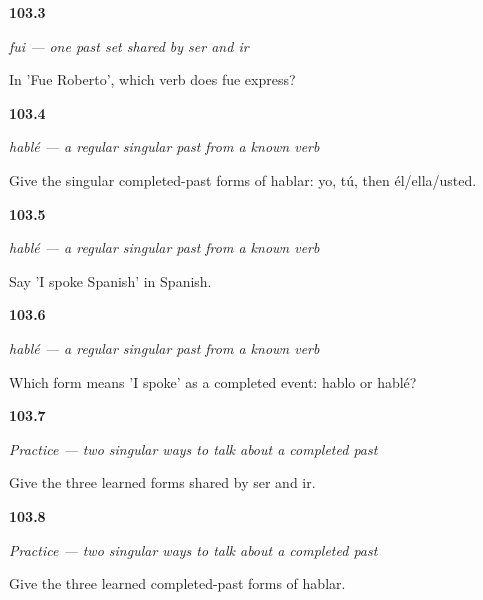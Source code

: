 \noindent\begin{minipage}[t]{\linewidth}
\raggedright
\hypertarget{review-ES-C14-ser-ir-preterite-context}{\textbf{103.3}} \emph{fui — one past set shared by ser and ir}\par
\small In 'Fue Roberto', which verb does fue express?
\end{minipage}\par\medskip

\noindent\begin{minipage}[t]{\linewidth}
\raggedright
\hypertarget{review-ES-C14-hablar-preterite-singular-forms}{\textbf{103.4}} \emph{hablé — a regular singular past from a known verb}\par
\small Give the singular completed-past forms of hablar: yo, tú, then él/ella/usted.
\end{minipage}\par\medskip

\noindent\begin{minipage}[t]{\linewidth}
\raggedright
\hypertarget{review-ES-C14-hablar-preterite-hable-espanol}{\textbf{103.5}} \emph{hablé — a regular singular past from a known verb}\par
\small Say 'I spoke Spanish' in Spanish.
\end{minipage}\par\medskip

\noindent\begin{minipage}[t]{\linewidth}
\raggedright
\hypertarget{review-ES-C14-hablar-preterite-present-past}{\textbf{103.6}} \emph{hablé — a regular singular past from a known verb}\par
\small Which form means 'I spoke' as a completed event: hablo or hablé?
\end{minipage}\par\medskip

\noindent\begin{minipage}[t]{\linewidth}
\raggedright
\hypertarget{review-ES-C14-practice-ser-ir-forms}{\textbf{103.7}} \emph{Practice — two singular ways to talk about a completed past}\par
\small Give the three learned forms shared by ser and ir.
\end{minipage}\par\medskip

\noindent\begin{minipage}[t]{\linewidth}
\raggedright
\hypertarget{review-ES-C14-practice-ar-forms}{\textbf{103.8}} \emph{Practice — two singular ways to talk about a completed past}\par
\small Give the three learned completed-past forms of hablar.
\end{minipage}\par\medskip

